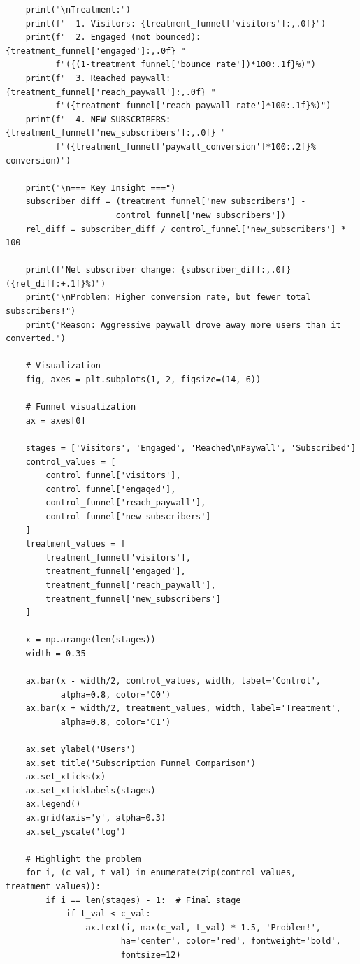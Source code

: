 \begin{lstlisting}
    print("\nTreatment:")
    print(f"  1. Visitors: {treatment_funnel['visitors']:,.0f}")
    print(f"  2. Engaged (not bounced): {treatment_funnel['engaged']:,.0f} "
          f"({(1-treatment_funnel['bounce_rate'])*100:.1f}%)")
    print(f"  3. Reached paywall: {treatment_funnel['reach_paywall']:,.0f} "
          f"({treatment_funnel['reach_paywall_rate']*100:.1f}%)")
    print(f"  4. NEW SUBSCRIBERS: {treatment_funnel['new_subscribers']:,.0f} "
          f"({treatment_funnel['paywall_conversion']*100:.2f}% conversion)")

    print("\n=== Key Insight ===")
    subscriber_diff = (treatment_funnel['new_subscribers'] -
                      control_funnel['new_subscribers'])
    rel_diff = subscriber_diff / control_funnel['new_subscribers'] * 100

    print(f"Net subscriber change: {subscriber_diff:,.0f} ({rel_diff:+.1f}%)")
    print("\nProblem: Higher conversion rate, but fewer total subscribers!")
    print("Reason: Aggressive paywall drove away more users than it converted.")

    # Visualization
    fig, axes = plt.subplots(1, 2, figsize=(14, 6))

    # Funnel visualization
    ax = axes[0]

    stages = ['Visitors', 'Engaged', 'Reached\nPaywall', 'Subscribed']
    control_values = [
        control_funnel['visitors'],
        control_funnel['engaged'],
        control_funnel['reach_paywall'],
        control_funnel['new_subscribers']
    ]
    treatment_values = [
        treatment_funnel['visitors'],
        treatment_funnel['engaged'],
        treatment_funnel['reach_paywall'],
        treatment_funnel['new_subscribers']
    ]

    x = np.arange(len(stages))
    width = 0.35

    ax.bar(x - width/2, control_values, width, label='Control',
           alpha=0.8, color='C0')
    ax.bar(x + width/2, treatment_values, width, label='Treatment',
           alpha=0.8, color='C1')

    ax.set_ylabel('Users')
    ax.set_title('Subscription Funnel Comparison')
    ax.set_xticks(x)
    ax.set_xticklabels(stages)
    ax.legend()
    ax.grid(axis='y', alpha=0.3)
    ax.set_yscale('log')

    # Highlight the problem
    for i, (c_val, t_val) in enumerate(zip(control_values, treatment_values)):
        if i == len(stages) - 1:  # Final stage
            if t_val < c_val:
                ax.text(i, max(c_val, t_val) * 1.5, 'Problem!',
                       ha='center', color='red', fontweight='bold',
                       fontsize=12)


\end{lstlisting}
